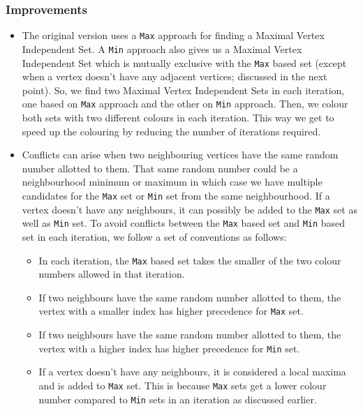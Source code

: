 \documentclass[MTech]{iitmdiss}
\begin{document}
\subsubsection{Improvements}
\begin{itemize}
\item The original version uses a \verb+Max+ approach for finding a Maximal Vertex Independent Set. A \verb+Min+ approach also gives us a Maximal Vertex Independent Set which is mutually exclusive with the \verb+Max+ based set (except when a vertex doesn't have any adjacent vertices; discussed in the next point). So, we find two Maximal Vertex Independent Sets in each iteration, one based on \verb+Max+ approach and the other on \verb+Min+ approach. Then, we colour both sets with two different colours in each iteration. This way we get to speed up the colouring by reducing the number of iterations required. 
\item Conflicts can arise when two neighbouring vertices have the same random number allotted to them. That same random number could be a neighbourhood minimum or maximum in which case we have multiple candidates for the \verb+Max+ set or \verb+Min+ set from the same neighbourhood. If a vertex doesn't have any neighbours, it can possibly be added to the  \verb+Max+ set as well as \verb+Min+ set. To avoid conflicts between the \verb+Max+ based set and \verb+Min+ based set in each iteration, we follow a set of conventions as follows:
\begin{itemize}
\item In each iteration, the \verb+Max+ based set takes the smaller of the two colour numbers allowed in that iteration.
\item If two neighbours have the same random number allotted to them, the vertex with a smaller index has higher precedence for \verb+Max+ set.
\item If two neighbours have the same random number allotted to them, the vertex with a higher index has higher precedence for \verb+Min+ set.
\item If a vertex doesn't have any neighbours, it is considered a local maxima and is added to \verb+Max+ set. This is because \verb+Max+ sets get a lower colour number compared to \verb+Min+ sets in an iteration as discussed earlier. 
\end{itemize}
\end{itemize}
\end{document}
